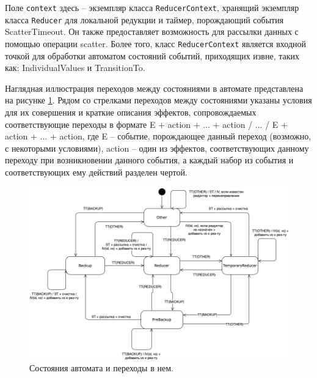 \documentclass{article}
\theoremstyle{plain}
\theoremstyle{plain}
\theoremstyle{plain}
\theoremstyle{plain}
\theoremstyle{definition}
\theoremstyle{remark}
\theoremstyle{plain}
\begin{document}

Поле \texttt{context} здесь -- экземпляр класса \texttt{ReducerContext}, хранящий экземпляр класса \texttt{Reducer} для локальной редукции и таймер, порождающий события ScatterTimeout. Он также предоставляет возможность для рассылки данных с помощью операции scatter. Более того, класс \texttt{ReducerContext} является входной точкой для обработки автоматом состояний событий, приходящих извне, таких как: IndividualValues и TransitionTo.

Наглядная иллюстрация переходов между состояниями в автомате представлена на рисунке \ref{StateMachineImage}. Рядом со стрелками переходов между состояниями указаны условия для их совершения и краткие описания эффектов, сопровождаемых соответствующие переходы в формате E + action + ... + action / ... / E + action + ... + action, где E -- событие, порождающее данный переход (возможно, с некоторыми условиями), action -- один из эффектов, соответствующих данному переходу при возникновении данного события, а каждый набор из события и соответствующих ему действий разделен чертой.

\begin{figure}[h]
\centering
\includegraphics[scale=0.45]{images/NeighbourStateMachine_rus.png}
\captionsetup{justification=centering}
\caption{Состояния автомата и переходы в нем.}
\label{StateMachineImage}
\end{figure}
\end{document}
